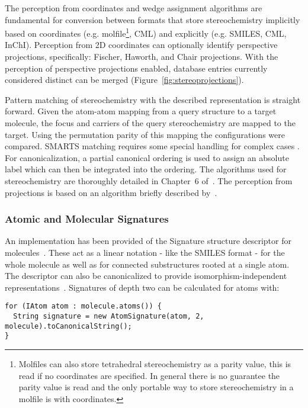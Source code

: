 \documentclass[doublespacing]{bmcart}
\begin{document}
  The perception from coordinates and wedge assignment algorithms are fundamental for conversion
  between formats that store stereochemistry implicitly based on coordinates (e.g. molfile\footnote{Molfiles 
  can also store tetrahedral stereochemistry as a parity value, this is read if no coordinates are specified.
  In general there is no guarantee the parity value is read and the only portable way to store
  stereochemistry in a molfile is with coordinates.}, CML) and 
  explicitly (e.g. SMILES, CML, InChI). Perception from 2D coordinates 
  can optionally identify
  perspective projections, specifically: Fischer, Haworth, and Chair projections. With the perception of 
  perspective projections enabled, database entries currently considered distinct can be merged
  (Figure~\ref{fig:stereoprojections}).


  Pattern matching of stereochemistry with the described representation is straight forward. Given
  the atom-atom mapping from a query structure to a target molecule, the focus and carriers of 
  the query stereochemistry are mapped to the target. Using the permutation parity of this mapping
  the configurations were compared. SMARTS matching requires some special handling for complex cases 
  \cite{May2014_SMARTS}. For canonicalization, a partial canonical ordering is used to assign an 
  absolute label which can then be integrated into the ordering. The algorithms used
  for stereochemistry are thoroughly detailed in Chapter~6 of~\cite{May2015}. The perception
  from projections is based on an algorithm briefly described by~\cite{Karapetyan2015}.

  \subsubsection*{Atomic and Molecular Signatures}

  An implementation has been provided of the Signature structure descriptor for
  molecules~\cite{Faulon2003}. These act as a linear notation - like the SMILES format - 
  for the whole molecule as well as for connected substructures rooted at a single atom. The 
  descriptor can also be canonicalized to provide isomorphism-independent
  representations~\cite{Faulon2004}. Signatures of depth two can be calculated
  for atoms with:

\vspace{0.2cm}
\begin{verbatim}
for (IAtom atom : molecule.atoms()) {
  String signature = new AtomSignature(atom, 2, molecule).toCanonicalString();
}
\end{verbatim}
\vspace{0.2cm}
\end{document}
